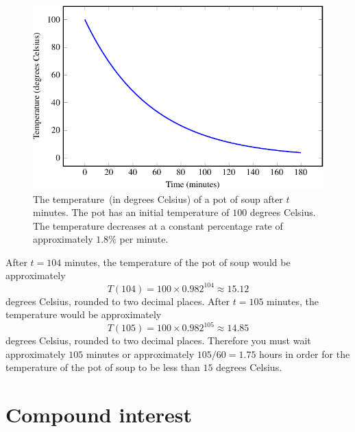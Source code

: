 \documentclass[a4paper,oneside,12pt]{article}
\begin{document}
{\begin{solution}
\begin{figure}[!htbp]
\centering
\includegraphics[scale=1.1]{image/11/soup.pdf}
\caption{%
  The temperature~(in degrees Celsius) of a pot of soup after $t$
  minutes.  The pot has an initial temperature of $100$ degrees
  Celsius.  The temperature decreases at a constant percentage rate of
  approximately $1.8\%$ per minute.
}
\label{fig:soup_temperature}
\end{figure}

After $t = 104$ minutes, the temperature of the pot of soup would be
approximately
\[
T(104)
=
100 \times 0.982^{104}
\approx
15.12
\]
degrees Celsius, rounded to two decimal places.  After $t = 105$
minutes, the temperature would be approximately
\[
T(105)
=
100 \times 0.982^{105}
\approx
14.85
\]
degrees Celsius, rounded to two decimal places.  Therefore you must
wait approximately $105$ minutes or approximately
$105 / 60 = 1.75$ hours in order for the temperature of the pot of
soup to be less than $15$ degrees Celsius.
\end{solution}
}{}



\section{Compound interest}
\end{document}
